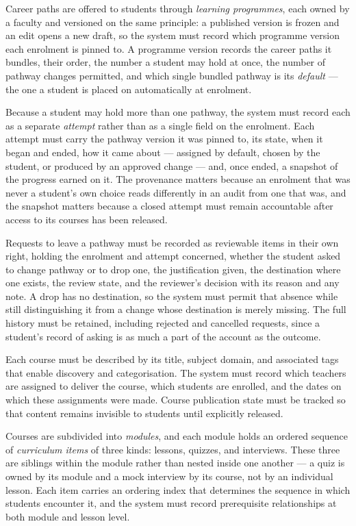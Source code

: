Career paths are offered to students through \textit{learning programmes},
each owned by a faculty and versioned on the same principle: a
published version is frozen and an edit opens a new draft, so the
system must record which programme version each enrolment is pinned
to. A programme version records the career paths it bundles, their
order, the number a student may hold at once, the number of pathway
changes permitted, and which single bundled pathway is its
\textit{default} --- the one a student is placed on automatically at
enrolment.

Because a student may hold more than one pathway, the system must
record each as a separate \textit{attempt} rather than as a single
field on the enrolment. Each attempt must carry the pathway version
it was pinned to, its state, when it began and ended, how it came
about --- assigned by default, chosen by the student, or produced by
an approved change --- and, once ended, a snapshot of the progress
earned on it. The provenance matters because an enrolment that was
never a student's own choice reads differently in an audit from one
that was, and the snapshot matters because a closed attempt must
remain accountable after access to its courses has been released.

Requests to leave a pathway must be recorded as reviewable items in
their own right, holding the enrolment and attempt concerned, whether
the student asked to change pathway or to drop one, the justification
given, the destination where one exists, the review state, and the
reviewer's decision with its reason and any note. A drop has no
destination, so the system must permit that absence while still
distinguishing it from a change whose destination is merely missing.
The full history must be retained, including rejected and cancelled
requests, since a student's record of asking is as much a part of
the account as the outcome.

Each course must be described by its title, subject domain, and 
associated tags that enable discovery and categorisation. The system 
must record which teachers are assigned to deliver the course, which 
students are enrolled, and the dates on which these assignments were 
made. Course publication state must be tracked so that content remains
invisible to students until explicitly released.

Courses are subdivided into \textit{modules}, and each module holds an
ordered sequence of \textit{curriculum items} of three kinds: lessons,
quizzes, and interviews. These three are siblings within the module
rather than nested inside one another — a quiz is owned by its module
and a mock interview by its course, not by an individual lesson. Each
item carries an ordering index that determines the sequence in which
students encounter it, and the system must record prerequisite
relationships at both module and lesson level.

